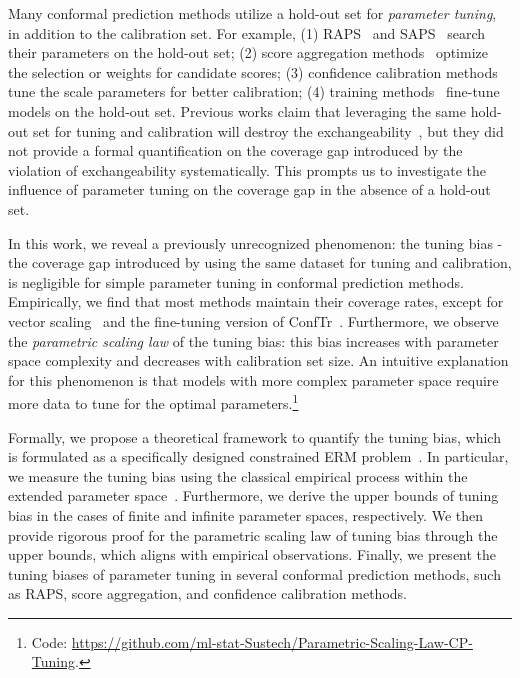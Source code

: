 \documentclass{article}
\newcommand{\1}{\mathbbm{1}}
\theoremstyle{plain}
\theoremstyle{definition}
\theoremstyle{remark}
\begin{document}
Many conformal prediction methods utilize a hold-out set for \textit{parameter tuning}, in addition to the calibration set. 
For example, 
(1) RAPS~\citep{angelopoulos2021uncertainty} and SAPS~\citep{huang2024conformal} search their parameters on the hold-out set; 
(2) score aggregation methods~\citep{yang2024selection, luo2024weighted, fan2024utopia} optimize the selection or weights for candidate scores;
(3) confidence calibration methods~\citep{guo2017calibration, xi2024does, dabah2024temperature} tune the scale parameters for better calibration;
(4) training methods~\citep{stutz2022learning,liu2025cadapter} fine-tune models on the hold-out set.
Previous works claim that leveraging the same hold-out set for tuning and calibration will destroy the exchangeability~\citep{angelopoulos2021uncertainty, yang2024selection, xi2024does, dabah2024temperature}, but they did not provide a formal quantification on the coverage gap introduced by the violation of exchangeability systematically.
This prompts us to investigate the influence of parameter tuning on the coverage gap in the absence of a hold-out set.

In this work, we reveal a previously unrecognized phenomenon: the tuning bias - the coverage gap introduced by using the same dataset for tuning and calibration, is negligible for simple parameter tuning in conformal prediction methods. %
Empirically, we find that most methods maintain their coverage rates, except for vector scaling~\citep{guo2017calibration} and the fine-tuning version of ConfTr~\citep{stutz2022learning}.  %
Furthermore, we observe the \textit{parametric scaling law} of the tuning bias: this bias increases with parameter space complexity and decreases with calibration set size. %
An intuitive explanation for this phenomenon is that models with more complex parameter space require more data to tune for the optimal parameters.\footnote{Code: \url{https://github.com/ml-stat-Sustech/Parametric-Scaling-Law-CP-Tuning}.}

Formally, we propose a theoretical framework to quantify the tuning bias, which is formulated as a specifically designed constrained ERM problem~\citep{bai2022efficient}. 
In particular, we measure the tuning bias using the classical empirical process within the extended parameter space~\citep{vandervaart1996weak}.  
Furthermore, we derive the upper bounds of tuning bias in the cases of finite and infinite parameter spaces, respectively.
We then provide rigorous proof for the parametric scaling law of tuning bias through the upper bounds, which aligns with empirical observations. 
Finally, we present the tuning biases of parameter tuning in several conformal prediction methods, such as RAPS, score aggregation, and confidence calibration methods.
\end{document}
